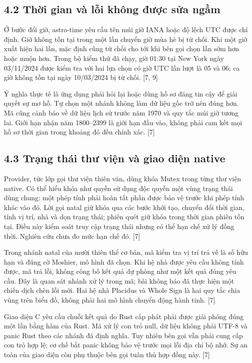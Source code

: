 \documentclass[11pt,a4paper]{article}
\begin{document}
\subsection*{4.2 Thời gian và lỗi không được sửa ngầm}
Ở bước đổi giờ, astro-time yêu cầu tên múi giờ IANA hoặc độ lệch UTC được chỉ định. Giờ không tồn tại trong một lần chuyển giờ mùa hè bị từ chối. Khi một giờ xuất hiện hai lần, mặc định cũng từ chối cho tới khi bên gọi chọn lần sớm hơn hoặc muộn hơn. Trong bộ kiểm thử đã chạy, giờ 01:30 tại New York ngày 03/\allowbreak{}11/\allowbreak{}2024 được kiểm tra với hai lựa chọn có giờ UTC lần lượt là 05 và 06; ca giờ không tồn tại ngày 10/\allowbreak{}03/\allowbreak{}2024 bị từ chối. [7, 9]


Ý nghĩa thực tế là ứng dụng phải hỏi lại hoặc dùng hồ sơ đáng tin cậy để giải quyết sự mơ hồ. Tự chọn một nhánh không làm dữ liệu gốc trở nên đúng hơn. Mã cũng cảnh báo về dữ liệu lịch sử trước năm 1970 và quy tắc múi giờ tương lai. Giới hạn nhận năm 1800–2399 là giới hạn đầu vào, không phải cam kết mọi hồ sơ thời gian trong khoảng đó đều chính xác. [7]


\subsection*{4.3 Trạng thái thư viện và giao diện native}
Provider, tức lớp gọi thư viện thiên văn, dùng khóa Mutex trong từng thư viện native. Có thể hiểu khóa như quyền sử dụng độc quyền một vùng trạng thái dùng chung: một phép tính phải hoàn tất phần được bảo vệ trước khi phép tính khác vào đó. Lời gọi natal giữ khóa qua các bước khởi tạo, chuyển đổi thời gian, tính vị trí, nhà và dọn trạng thái; phiên quét giữ khóa trong thời gian phiên tồn tại. Điều này kiểm soát truy cập trạng thái nhưng có thể hạn chế xử lý đồng thời. Nghiên cứu chưa đo mức hạn chế đó. [7]


Trong nhánh natal của mười thiên thể cơ bản, mã kiểm tra vị trí trả về là số hữu hạn và đúng cờ Moshier, mô hình đã chọn. Khi hệ nhà được yêu cầu không tính được, mã trả lỗi, không công bố kết quả dự phòng như một kết quả đúng yêu cầu. Đây là quan sát nhánh xử lý trong mã; bài không báo đã thực hiện một chiến dịch chèn lỗi mới. Hai hệ nhà Placidus và Whole Sign là hai quy tắc chia vùng trên biểu đồ, không phải hai mô hình chuyển động hành tinh. [7]


Giao diện C yêu cầu chuỗi kết quả do Rust cấp phát phải được giải phóng đúng một lần bằng hàm của Rust. Mã xử lý con trỏ null, dữ liệu không phải UTF-8 và panic Rust theo các nhánh đã định nghĩa. Tuy nhiên bên gọi vẫn phải cung cấp con trỏ hợp lệ; cơ chế bắt panic không bảo vệ trước mọi lỗi địa chỉ bộ nhớ. Sự an toàn của giao diện còn phụ thuộc bên gọi tuân thủ hợp đồng này. [7]
\end{document}
